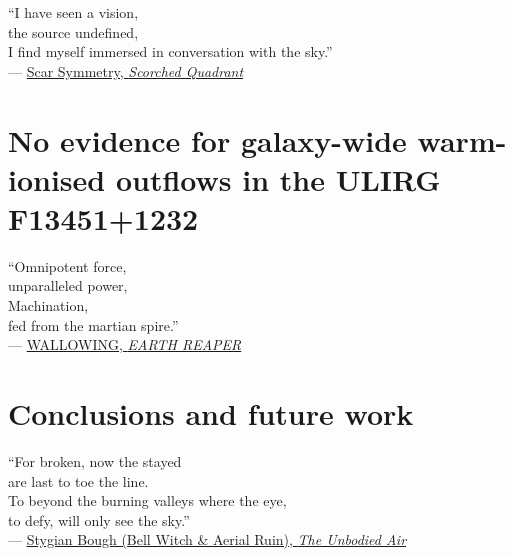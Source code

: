 \documentclass[12pt, twoside, openright]{report}
\begin{document}
\vspace*{2cm}
\vbox{\large``I have seen a vision,\\
the source undefined,\\
I find myself immersed in conversation with the sky.''\\

--- \href{https://www.scarsymmetryofficial.com/}{Scar Symmetry, \textit{Scorched Quadrant}}}
\newpage
\noindent
\newpage
\noindent



\chapter{No evidence for galaxy-wide warm-ionised outflows in the ULIRG F13451+1232}
\label{chapter: muse_f13451_1232}

\vspace*{2cm}
\vbox{\large``Omnipotent force,\\
unparalleled power,\\

\noindent
Machination,\\
fed from the martian spire.''\\

--- \href{https://wallowingnoise.bandcamp.com/album/earth-reaper}{WALLOWING, \textit{EARTH REAPER}}}
\newpage
\noindent



\chapter{Conclusions and future work}
\label{chapter: conclusions_and_future_work}

\vspace*{2cm}
\vbox{\large``For broken, now the stayed\\
are last to toe the line.\\
To beyond the burning valleys where the eye,\\
to defy, will only see the sky.''\\

--- \href{https://bellwitch.bandcamp.com/album/stygian-bough-volume-i}{Stygian Bough (Bell Witch \& Aerial Ruin), \textit{The Unbodied Air}}}

\newpage
\noindent

\end{document}
